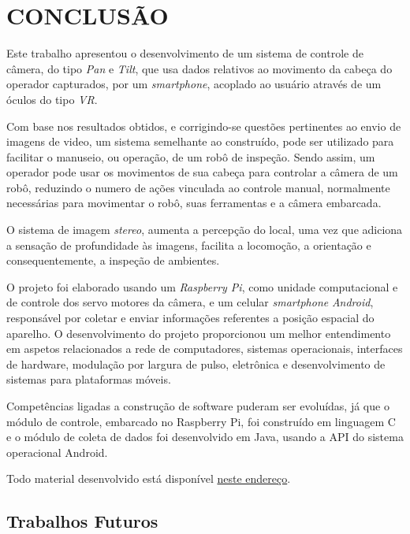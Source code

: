 
\chapter{CONCLUSÃO}
\label{chap:conclusao}

Este trabalho apresentou o desenvolvimento de um sistema de controle de câmera, do tipo \textit{Pan} e \textit{Tilt}, que usa dados relativos ao movimento da cabeça do operador capturados, por um \textit{smartphone}, acoplado ao usuário através de um óculos do tipo \textit{VR}.\par
Com base nos resultados obtidos, e corrigindo-se questões pertinentes ao envio de imagens de video, um sistema semelhante ao construído, pode ser utilizado para facilitar o manuseio, ou operação, de um robô de inspeção. Sendo assim, um operador pode usar os movimentos de sua cabeça para controlar a câmera de um robô, reduzindo o numero de ações vinculada ao controle manual, normalmente necessárias para movimentar o robô, suas ferramentas e a câmera embarcada. \par 
O sistema de imagem \textit{stereo}, aumenta a percepção do local, uma vez que adiciona a sensação de profundidade às imagens, facilita a locomoção, a orientação e consequentemente, a inspeção de ambientes.

O projeto foi elaborado usando um \textit{Raspberry Pi}, como unidade computacional e de controle dos servo motores da câmera, e um celular \textit{smartphone} \textit{Android}, responsável por coletar e enviar informações referentes a posição espacial do aparelho. O desenvolvimento do projeto proporcionou um melhor entendimento em aspetos relacionados a rede de computadores, sistemas operacionais, interfaces de hardware, modulação por largura de pulso, eletrônica e desenvolvimento de sistemas para plataformas móveis.\par

Competências ligadas a construção de software puderam ser evoluídas, já que o módulo de controle, embarcado no Raspberry Pi, foi construído em linguagem C e o módulo de coleta de dados foi desenvolvido em Java, usando a API do sistema operacional Android.\par

Todo material desenvolvido está disponível \href{https://github.com/raffsalvetti/ENGG60}{neste endereço}.


\section{Trabalhos Futuros}
\label{sec:trabalhosFuturos}

